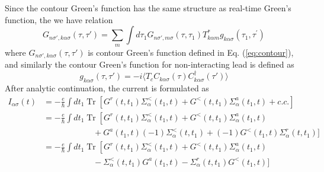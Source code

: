 \documentclass[11pt,a4paper]{article}
\begin{document}
Since the contour Green's function has the same structure as real-time Green's function, the we have relation
\begin{equation}
G_{n\sigma',k\alpha\sigma}(\tau,\tau')=\sum_{m}\int d \tau_{1} G_{n\sigma',m\sigma}\left(\tau, \tau_{1}\right) T_{k \alpha m}^{*} g_{k \alpha\sigma}\left(\tau_{1}, \tau^{\prime}\right)
\end{equation}
where $G_{n\sigma',k\alpha\sigma}(\tau,\tau')$ is contour Green's function defined in Eq. (\ref{eq:contour}), and similarly the contour Green's function for non-interacting lead is defined as
\begin{equation}
g_{k\alpha\sigma}(\tau,\tau') = -i\langle T_{c}C_{k\alpha\sigma}(\tau)C_{k\alpha\sigma}^{\dag}(\tau')\rangle
\end{equation}
After analytic continuation, the current is formulated as
\begin{equation}
\begin{aligned}
I_{\alpha\sigma}(t) &=-\frac{e}{\hbar} \int d t_{1} \operatorname{Tr}\left[G^{r}\left(t, t_{1}\right) \Sigma_{\alpha}^{<}\left(t_{1}, t\right)+G^{<}\left(t, t_{1}\right) \Sigma_{\alpha}^{a}\left(t_{1}, t\right)+c.c.\right] \\
&= -\frac{e}{\hbar} \int d t_{1} \operatorname{Tr}\left[G^{r}\left(t, t_{1}\right) \Sigma_{\alpha}^{<}\left(t_{1}, t\right) + G^{<}\left(t, t_{1}\right) \Sigma_{\alpha}^{a}\left(t_{1}, t\right)\\
&\qquad\qquad\qquad +G^{a}\left(t_{1},t\right) (-1)\Sigma_{\alpha}^{<}\left(t, t_{1}\right) + (-1)G^{<}\left(t_{1}, t\right) \Sigma_{\alpha}^{r}\left(t,t_{1}\right) ] \\
&= -\frac{e}{\hbar} \int d t_{1} \operatorname{Tr}\left[G^{r}\left(t, t_{1}\right) \Sigma_{\alpha}^{<}\left(t_{1}, t\right) + G^{<}\left(t, t_{1}\right) \Sigma_{\alpha}^{a}\left(t_{1}, t\right)\\
&\qquad\qquad\qquad - \Sigma_{\alpha}^{<}\left(t, t_{1}\right)G^{a}\left(t_{1},t\right) -  \Sigma_{\alpha}^{r}\left(t,t_{1}\right) G^{<}\left(t_{1}, t\right) ] 
\end{aligned}
\end{equation}
\end{document}
